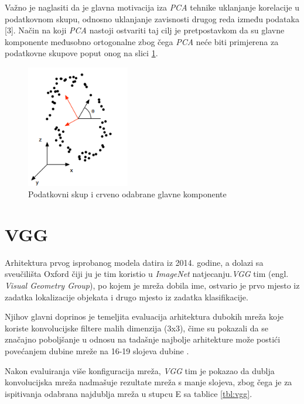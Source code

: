 \documentclass[times, utf8, proizvoljni, numeric]{fer}
\begin{document}
Važno je naglasiti da je glavna motivacija iza \textit{PCA} tehnike uklanjanje korelacije u podatkovnom skupu, odnosno uklanjanje zavisnosti drugog reda između podataka [3]. Način na koji \textit{PCA} nastoji ostvariti taj cilj je pretpostavkom da su glavne komponente međusobno ortogonalne zbog čega \textit{PCA} neće biti primjerena za podatkovne skupove poput onog na slici \ref{fg:pca_problem}.

\begin{figure}[H]
	\begin{center}
		\captionsetup{justification=centering}
		\includegraphics[width=0.4\textwidth]{./imgs/pca_problem.png}
		\caption{Podatkovni skup i crveno odabrane glavne komponente \cite{PCA}}
		\label{fg:pca_problem}
	\end{center}
\end{figure}


\section{VGG}

Arhitektura prvog isprobanog modela datira iz 2014. godine, a dolazi sa sveučilišta Oxford čiji ju je tim koristio u \textit{ImageNet} natjecanju.\textit{VGG} tim (engl. \textit{Visual Geometry Group}), po kojem je mreža dobila ime, ostvario je prvo mjesto iz zadatka lokalizacije objekata i drugo mjesto iz zadatka klasifikacije.

Njihov glavni doprinos je temeljita evaluacija arhitektura dubokih mreža koje koriste konvolucijske filtere malih dimenzija (3x3), čime su pokazali da se značajno poboljšanje u odnosu na tadašnje najbolje arhitekture može postići povećanjem dubine mreže na 16-19 slojeva dubine \cite{VGG}. 

Nakon evaluiranja više konfiguracija mreža, \textit{VGG} tim je pokazao da dublja konvolucijska mreža nadmašuje rezultate mreža s manje slojeva, zbog čega je za ispitivanja odabrana najdublja mreža u stupcu E sa tablice \ref{tbl:vgg}.
\end{document}
